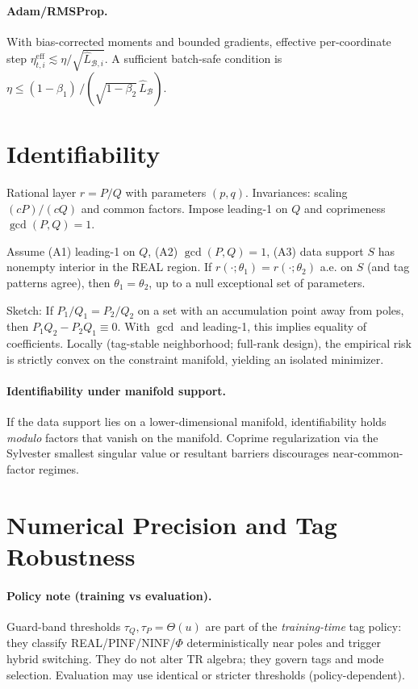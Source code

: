 \documentclass[twoside,11pt]{article}
\newcommand{\trReal}{\textsc{REAL}}
\newcommand{\trPINF}{\textsc{PINF}}
\newcommand{\trNINF}{\textsc{NINF}}
\newcommand{\trPHI}{\textsc{$\Phi$}}
\newcommand{\TAGREAL}{\trReal}
\newcommand{\TAGPINF}{\trPINF}
\newcommand{\TAGNINF}{\trNINF}
\newcommand{\TAGPHI}{\trPHI}
\begin{document}
\paragraph{Adam/RMSProp.} With bias-corrected moments and bounded gradients, effective per-coordinate step $\eta_{t,i}^{\mathrm{eff}}\lesssim \eta/\sqrt{\hat L_{\mathcal{B},i}}$. A sufficient batch-safe condition is $\eta\le (1-\beta_1)\,/(\sqrt{1-\beta_2}\,\widehat L_\mathcal{B})$.

\section*{Identifiability}
\label{sec:ident}
Rational layer $r=P/Q$ with parameters $(p,q)$. Invariances: scaling $(cP)/(cQ)$ and common factors. Impose leading-1 on $Q$ and coprimeness $\gcd(P,Q)=1$.
\begin{proposition}[Identifiability a.e.]\label{prop:ident-prop}
Assume (A1) leading-1 on $Q$, (A2) $\gcd(P,Q)=1$, (A3) data support $S$ has nonempty interior in the \TAGREAL{} region. If $r(\cdot;\theta_1)=r(\cdot;\theta_2)$ a.e. on $S$ (and tag patterns agree), then $\theta_1=\theta_2$, up to a null exceptional set of parameters.
\end{proposition}
Sketch: If $P_1/Q_1=P_2/Q_2$ on a set with an accumulation point away from poles, then $P_1Q_2-P_2Q_1\equiv0$. With $\gcd$ and leading-1, this implies equality of coefficients. Locally (tag-stable neighborhood; full-rank design), the empirical risk is strictly convex on the constraint manifold, yielding an isolated minimizer.
\paragraph{Identifiability under manifold support.}\label{sec:ident-manifold}
If the data support lies on a lower-dimensional manifold, identifiability holds \emph{modulo} factors that vanish on the manifold. Coprime regularization via the Sylvester smallest singular value or resultant barriers discourages near-common-factor regimes.

\section*{Numerical Precision and Tag Robustness}
\label{sec:precision-tags}
\paragraph{Policy note (training vs evaluation).} Guard-band thresholds $\tau_Q,\tau_P=\Theta(u)$ are part of the \emph{training-time} tag policy: they classify \TAGREAL/\TAGPINF/\TAGNINF/\TAGPHI{} deterministically near poles and trigger hybrid switching. They do not alter TR algebra; they govern tags and mode selection. Evaluation may use identical or stricter thresholds (policy-dependent).
\end{document}
